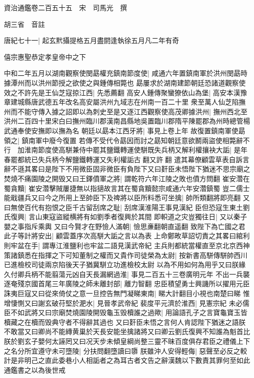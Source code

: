資治通鑑卷二百五十五　宋　司馬光　撰

胡三省　音註

唐紀七十一|{
	起玄黓攝提格五月盡閼逢執徐五月凡二年有奇}


僖宗惠聖恭定孝皇帝中之下

中和二年五月以湖南觀察使閔勗權充鎮南節度使|{
	咸通六年置鎮南軍於洪州閔勗時據潭州而以洪州節授之欲使之與鍾傳相斃也}
勗屢求於湖南建節朝廷恐諸道觀察使效之不許先是王仙芝寇掠江西|{
	先悉薦翻}
高安人鍾傳聚蠻獠依山為堡|{
	高安本漢豫章建城縣唐武德五年改名高安屬洪州九域志在州南一百二十里}
衆至萬人仙芝陷撫州而不能守傳入據之詔即以為刺史至是又逐江西觀察使高茂卿據洪州|{
	撫州西北至洪州二百四十里宋白曰撫州臨川郡漢南昌縣地吳置臨川郡隋平陳罷郡為州時總管楊武通奉使安撫即以撫為名}
朝廷以勗本江西牙將|{
	事見上卷上年}
故復置鎮南軍使勗領之|{
	鎮南軍中廢今復置}
若傳不受代令勗因而討之勗知朝廷意欲鬭兩盜使相斃辭不行　加淮南節度使高駢兼侍中罷其鹽鐵轉運使駢既失兵柄又解利權攘袂大詬|{
	是年春罷都統已失兵柄今解鹽鐵轉運又失利權詬古翻又許翻}
遣其幕僚顧雲草表自訴言辭不遜其畧曰是陛下不用微臣固非微臣有負陛下又曰姧臣未悟陛下猶迷不思宗廟之焚燒不痛園陵之開毁又曰王鐸僨軍之將|{
	謂乾符六年江陵之敗也僨方問翻}
崔安濳在蜀貪黷|{
	崔安濳擊賊屢捷無以指擿故言其在蜀貪黷懿宗咸通六年安濳鎮蜀}
豈二儒士能戢疆兵又曰今之所用上至帥臣下及禆將以臣所料悉可坐擒|{
	帥所類翻將即亮翻}
又曰無使百代有抱恨之臣千古留刮席之耻|{
	刮席漢淮陽王事見漢紀}
臣但恐寇生東土劉氏復興|{
	言山東寇盜縱横將有如劉季者復興於其間}
即軹道之灾豈獨往日|{
	又以秦子嬰之事指斥乘輿}
又曰今賢才在野憸人滿朝|{
	憸思亷翻朝直遥翻}
致陛下為亡國之君此子等計將安出|{
	顧雲蓋序次高駢大詬之言以為表}
上命鄭畋草詔切責之其畧曰綰利則牢盆在手|{
	謂專江淮鹽利也牢盆二語見漢武帝紀}
主兵則都統當權直至京北京西神策諸鎮悉在指揮之下可知董制之權而又貴作司徒榮為太尉|{
	按新書高駢傳駢帥西川已進檢校司徒兩京陷後天子猶冀駢立功進檢校太尉}
以為不用如何為用乎又曰朕緣久付卿兵柄不能翦蕩元凶自天長漏網過淮|{
	事見二百五十三卷廣明元年}
不出一兵襲逐奄殘京國首尾三年廣陵之師未離封部|{
	離力智翻}
忠臣積望勇士興譏所以擢用元臣誅夷巨寇又曰從來倚仗之意一旦控告無門凝睇東南|{
	睇大計翻目小視也南楚曰睇}
惟增悽惻又曰謝玄破苻堅於淝水|{
	見晉孝武帝紀}
裴度平元濟於淮西|{
	見憲宗紀}
未必儒臣不如武將又曰宗廟焚燒園陵開毁龜玉毁櫝誰之過歟|{
	用論語孔子之言寶龜寶玉皆櫝藏之在櫝而毁典守者不得辭其過也}
又曰姧臣未悟之言何人肯認陛下猶迷之語朕不敢當又曰卿尚不能縳黄巢於天長安能坐擒諸將又曰卿云劉氏復興不知誰為魁首比朕於劉玄子嬰何太誣罔又曰况天步未傾皇綱尚整三靈不昧百度俱存君臣之禮儀上下之名分所宜遵守未可墮陵|{
	分扶問翻墮讀曰隳}
朕雖沖人安得輕侮|{
	惡聲至必反之較計是非明己之直此委巷小人相詬者之為耳古者文告之辭漢魏以下數責其罪何至如此通鑑書之以為後世戒}
